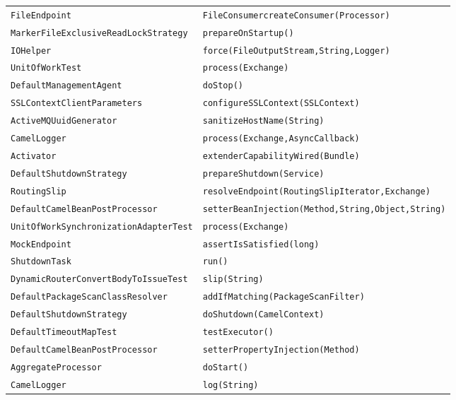 \begin{center}
\begin{longtable}{ll}
\lstinline/FileEndpoint/&{\lstinline/FileConsumercreateConsumer(Processor)/}\\
\lstinline/MarkerFileExclusiveReadLockStrategy/&{\lstinline/prepareOnStartup()/}\\
\lstinline/IOHelper/&{\lstinline/force(FileOutputStream,String,Logger)/}\\
\lstinline/UnitOfWorkTest/&{\lstinline/process(Exchange)/}\\
\lstinline/DefaultManagementAgent/&{\lstinline/doStop()/}\\
\lstinline/SSLContextClientParameters/&{\lstinline/configureSSLContext(SSLContext)/}\\
\lstinline/ActiveMQUuidGenerator/&{\lstinline/sanitizeHostName(String)/}\\
\lstinline/CamelLogger/&{\lstinline/process(Exchange,AsyncCallback)/}\\
\lstinline/Activator/&{\lstinline/extenderCapabilityWired(Bundle)/}\\
\lstinline/DefaultShutdownStrategy/&{\lstinline/prepareShutdown(Service)/}\\
\lstinline/RoutingSlip/&{\lstinline/resolveEndpoint(RoutingSlipIterator,Exchange)/}\\
\lstinline/DefaultCamelBeanPostProcessor/&{\lstinline/setterBeanInjection(Method,String,Object,String)/}\\
\lstinline/UnitOfWorkSynchronizationAdapterTest/&{\lstinline/process(Exchange)/}\\
\lstinline/MockEndpoint/&{\lstinline/assertIsSatisfied(long)/}\\
\lstinline/ShutdownTask/&{\lstinline/run()/}\\
\lstinline/DynamicRouterConvertBodyToIssueTest/&{\lstinline/slip(String)/}\\
\lstinline/DefaultPackageScanClassResolver/&{\lstinline/addIfMatching(PackageScanFilter)/}\\
\lstinline/DefaultShutdownStrategy/&{\lstinline/doShutdown(CamelContext)/}\\
\lstinline/DefaultTimeoutMapTest/&{\lstinline/testExecutor()/}\\
\lstinline/DefaultCamelBeanPostProcessor/&{\lstinline/setterPropertyInjection(Method)/}\\
\lstinline/AggregateProcessor/&{\lstinline/doStart()/}\\
\lstinline/CamelLogger/&{\lstinline/log(String)/}\\

\end{longtable}
\end{center}


